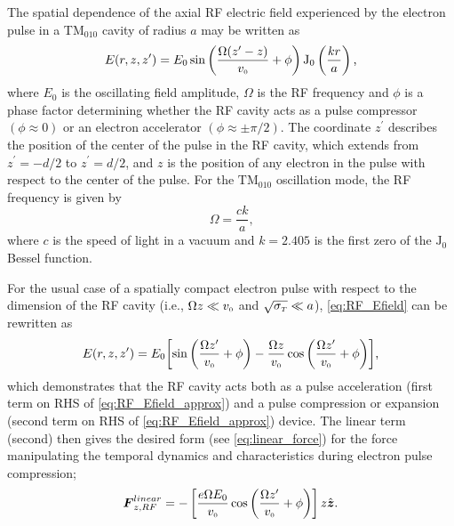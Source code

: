 The spatial dependence of the axial RF electric field experienced by the electron pulse in a TM$_{010}$ cavity of radius $a$ may be written as
\begin{equation} \label{eq:RF_Efield}
  E ( r , z , z^{\prime} ) = E_{0} \sin \left ( \frac{ \Omega ( z^{\prime} - z ) }{ v_{{\scriptscriptstyle 0}} } + \phi \right )\operatorname{J_{0}} \left ( \frac{ k r }{ a } \right ) \text{,}
\end{equation}
where $ E_{ 0 } $ is the oscillating field amplitude, $\Omega$ is the RF frequency and $\phi$ is a phase factor determining whether the RF cavity acts as a pulse compressor $ ( \phi \approx 0 ) $ or an electron accelerator $ ( \phi \approx \pm \pi/2 ) $.
The coordinate $z^{\prime} $ describes the position of the center of the pulse in the RF cavity, which extends from $ z^{\prime} = - d / 2 $ to $ z^{\prime} = d / 2 $, and $z$ is the position of any electron in the pulse with respect to the center of the pulse.
For the $\text{TM}_{010}$ oscillation mode, the RF frequency is given by
\begin{equation}
  \Omega = \frac{ c k }{a} \text{,}
\end{equation}
where $c$ is the speed of light in a vacuum and $ k = 2.405 $ is the first zero of the $\operatorname{ J_{0} }$ Bessel function.

For the usual case of a spatially compact electron pulse with respect to the dimension of the RF cavity (i.e., $ \Omega z \ll v_{{\scriptscriptstyle 0}} $ and $ \sqrt{\sigma_{{\scriptscriptstyle T}}} \ll a $), \ref{eq:RF_Efield} can be rewritten as
\begin{equation} \label{eq:RF_Efield_approx}
  E ( r , z , z^{\prime} ) = E_{0} \biggl [ \sin \left ( \frac{ \Omega z^{\prime} }{ v_{{\scriptscriptstyle 0}} } + \phi \right ) - \frac{ \Omega z }{ v_{{\scriptscriptstyle 0}} } \cos \left ( \frac{ \Omega z^{\prime} }{ v_{{\scriptscriptstyle 0}} } + \phi \right ) \biggr ] \text{,}
\end{equation}
which demonstrates that the RF cavity acts both as a pulse acceleration (first term on RHS of \ref{eq:RF_Efield_approx}) and a pulse compression or expansion (second term on RHS of \eqref{eq:RF_Efield_approx}) device. %
The linear term (second) then gives the desired form (see \ref{eq:linear_force}) for the force manipulating the temporal dynamics and characteristics during electron pulse compression;
\begin{equation} \label{eq:RF_Force_z}
  \boldsymbol{F}_{ z , RF }^{linear} = - \left [ \frac{ e \Omega E_{0} }{ v_{{\scriptscriptstyle 0}} } \cos \left ( \frac{ \Omega z^{\prime} }{ v_{{\scriptscriptstyle 0}} } + \phi \right ) \right ] z \hat{\operatorname{ \boldsymbol{z} }} \text{.}
\end{equation}

